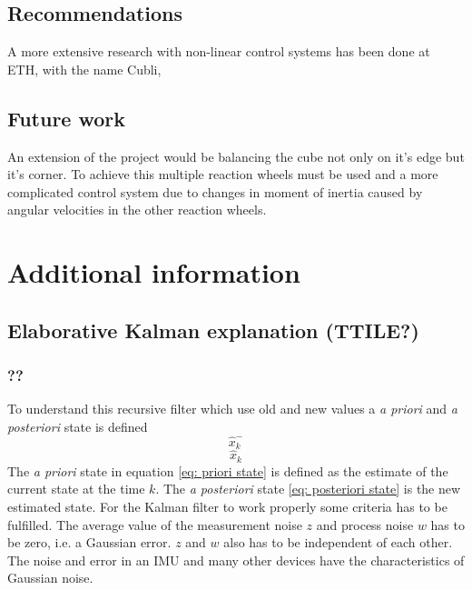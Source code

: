 \documentclass[a4paper,11pt]{kth-mag}
\begin{document}
\section{Recommendations}
A more extensive research with non-linear control systems has been done at ETH, with the name Cubli,\cite{cubliECC13}

\section{Future work}
An extension of the project would be balancing the cube not only on it's edge but it's corner. To achieve this multiple reaction wheels must be used and a more complicated control system due to changes in moment of inertia caused by angular velocities in the other reaction wheels.

%
\cleardoublepage


\cleardoublepage
\appendix
{}


\chapter{Additional information} \label{appA}
\section{Elaborative Kalman explanation (TTILE?)} \label{app: Kalman}
\subsection{??}
To understand this recursive filter which use old and new values a \textit{a priori} and \textit{a posteriori} state is defined
\begin{equation} \label{eq: priori state}
\hat{x}^-_k
\end{equation}
\begin{equation} \label{eq: posteriori state}
\hat{x}_k
\end{equation}
The \textit{a priori}  state in equation \eqref{eq: priori state} is defined as the estimate of the current state at the time $k$. The \textit{a posteriori} state \eqref{eq: posteriori state} is the new estimated state.
For the Kalman filter to work properly some criteria has to be fulfilled. The average value of the measurement noise $z$ and process noise $w$ has to be zero, i.e. a Gaussian error. $z$ and $w$ also has to be independent of  each other. The noise and error in an IMU and many other devices have the characteristics of Gaussian noise.
\end{document}
